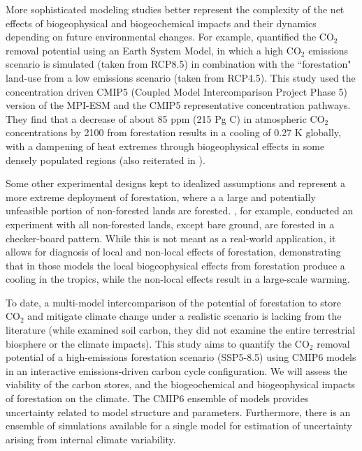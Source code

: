 \documentclass[]{article}
\begin{document}
More sophisticated modeling studies better represent the complexity of the net effects of biogeophysical and biogeochemical impacts and their dynamics depending on future environmental changes.
For example, \cite{sonntag_reforestation_2016} quantified the CO$_2$ removal potential using an Earth System Model, in which a high CO$_2$ emissions scenario is simulated (taken from RCP8.5) in combination with the ``forestation" land-use from a low emissions scenario (taken from RCP4.5).
This study used the concentration driven CMIP5 (Coupled Model Intercomparison Project Phase 5) version of the MPI-ESM and the CMIP5 representative concentration pathways.
They find that a decrease of about 85 ppm (215 Pg C) in atmospheric CO$_2$ concentrations by 2100 from forestation results in a cooling of 0.27 K globally, with a dampening of heat extremes through biogeophysical effects in some densely populated regions (also reiterated in \cite{sonntag_quantifying_2018}).

Some other experimental designs kept to idealized assumptions and represent a more extreme deployment of forestation, where a a large and potentially unfeasible portion of non-forested lands are forested.
\cite{de_hertog_biogeophysical_2022}, for example, conducted an experiment with all non-forested lands, except bare ground, are forested in a checker-board pattern.
While this is not meant as a real-world application, it allows for diagnosis of local and non-local effects of forestation, demonstrating that in those models the local biogeophysical effects from forestation produce a cooling in the tropics, while the non-local effects result in a large-scale warming.

To date, a multi-model intercomparison of the potential of forestation to store CO$_2$ and mitigate climate change under a realistic scenario is lacking from the literature (while \cite{ito_soil_2020} examined soil carbon, they did not examine the entire terrestrial biosphere or the climate impacts).
This study aims to quantify the CO$_2$ removal potential of a high-emissions forestation scenario (SSP5-8.5) using CMIP6 models in an interactive emissions-driven carbon cycle configuration.
We will assess the viability of the carbon stores, and the biogeochemical and biogeophysical impacts of forestation on the climate.
The CMIP6 ensemble of models provides uncertainty related to model structure and parameters.
Furthermore, there is an ensemble of simulations available for a single model for estimation of uncertainty arising from internal climate variability. 
\end{document}
